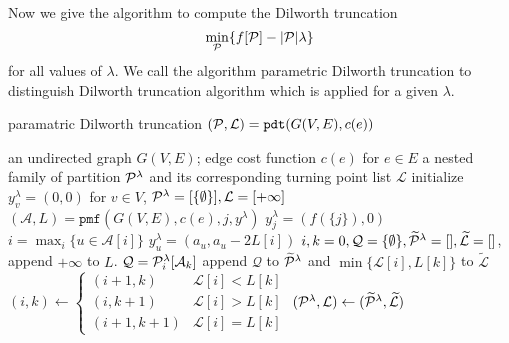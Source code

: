 \documentclass{article}
\begin{document}
Now we give the algorithm to compute the Dilworth truncation $$\min_{\P}\{f[\P] - \abs{\P} \lambda \}$$for all values of $\lambda$. We call the algorithm parametric Dilworth truncation to distinguish Dilworth truncation algorithm which is applied for a given $\lambda$.
\begin{algorithm}
\caption{paramatric Dilworth truncation $(\P, \mathcal{L})=\texttt{pdt}(G(V,E), c(e))$}
\begin{algorithmic}[1]
\REQUIRE an undirected graph $G(V, E)$; edge cost function $c(e)$ for $e\in E$
\ENSURE a nested family of partition $\P^{\lambda}$ and its corresponding turning point list $\mathcal{L}$
\STATE initialize $y^{\lambda}_v = (0, 0)$ for $ v \in V$, $\P^{\lambda} = [\{\emptyset\}], \mathcal{L} = [+\infty]$
\STATE  $(\mathcal{A}, L) = \texttt{pmf}(G(V,E), c(e), j, y^{\lambda})$
\STATE $y^{\lambda}_j = (f(\{j\}), 0)$
\ELSE
\STATE $ i = \max_i \{ u \in \mathcal{A}[i]\}$
\STATE $y_u^{\lambda} = (a_u, a_u - 2 L[i])$
\ENDIF
\ENDIF
\ENDFOR
\STATE $i, k = 0, \mathcal{Q} = \{\emptyset\}, \widetilde{\mathcal{\P}}^{\lambda} = [], \widetilde{\mathcal{L}} = []$, append $+\infty$ to $L$.
\STATE $\mathcal{Q} = \P^{\lambda}_i[\mathcal{A}_k]$
\STATE append $\mathcal{Q}$ to $\widetilde{\mathcal{\P}}^{\lambda}$ and $\min\{\mathcal{L}[i], L[k]\}$
to $\widetilde{\mathcal{L}}$
\ENDIF
\STATE $(i, k) \leftarrow \begin{cases} (i+1, k) & \mathcal{L}[i] < L[k] \\  (i, k+1) & \mathcal{L}[i] > L[k]\\ (i+1, k+1) & \mathcal{L}[i] = L[k]\end{cases}$
\ENDWHILE
\STATE $(\P^{\lambda}, \mathcal{L}) \leftarrow (\widetilde{\mathcal{\P}}^{\lambda},  \widetilde{\mathcal{L}})$
\ENDFOR
\end{algorithmic}
\end{algorithm}
\end{document}
